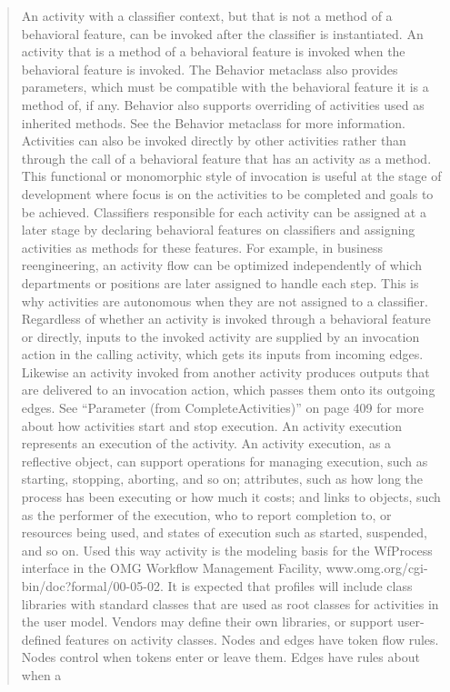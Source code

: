 \begin{quotation}
An activity with a classifier context, but that is not a method of a behavioral feature, can be invoked after the classifier is
instantiated. An activity that is a method of a behavioral feature is invoked when the behavioral feature is invoked. The
Behavior metaclass also provides parameters, which must be compatible with the behavioral feature it is a method of, if
any. Behavior also supports overriding of activities used as inherited methods. See the Behavior metaclass for more
information.
Activities can also be invoked directly by other activities rather than through the call of a behavioral feature that has an
activity as a method. This functional or monomorphic style of invocation is useful at the stage of development where
focus is on the activities to be completed and goals to be achieved. Classifiers responsible for each activity can be
assigned at a later stage by declaring behavioral features on classifiers and assigning activities as methods for these
features. For example, in business reengineering, an activity flow can be optimized independently of which departments
or positions are later assigned to handle each step. This is why activities are autonomous when they are not assigned to a
classifier.
Regardless of whether an activity is invoked through a behavioral feature or directly, inputs to the invoked activity are
supplied by an invocation action in the calling activity, which gets its inputs from incoming edges. Likewise an activity
invoked from another activity produces outputs that are delivered to an invocation action, which passes them onto its
outgoing edges. See “Parameter (from CompleteActivities)” on page 409 for more about how activities start and stop
execution.
An activity execution represents an execution of the activity. An activity execution, as a reflective object, can support
operations for managing execution, such as starting, stopping, aborting, and so on; attributes, such as how long the
process has been executing or how much it costs; and links to objects, such as the performer of the execution, who to
report completion to, or resources being used, and states of execution such as started, suspended, and so on. Used this
way activity is the modeling basis for the WfProcess interface in the OMG Workflow Management Facility,
www.omg.org/cgi-bin/doc?formal/00-05-02. It is expected that profiles will include class libraries with standard classes
that are used as root classes for activities in the user model. Vendors may define their own libraries, or support user-
defined features on activity classes.
Nodes and edges have token flow rules. Nodes control when tokens enter or leave them. Edges have rules about when a

\end{quotation}
